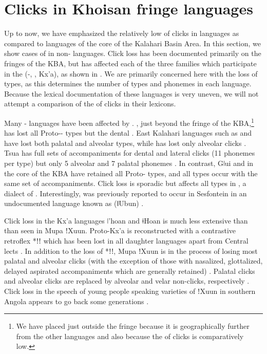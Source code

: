 \documentclass[output=paper
,newtxmath
,modfonts
,nonflat]{langsci/langscibook}
\begin{document}
\section{Clicks in Khoisan fringe languages}\label{sec:sands:5}

Up to now, we have emphasized the relatively low  of clicks in  languages as compared to languages of the core of the Kalahari Basin Area. In this section, we show cases of  in non- languages. Click loss has been documented primarily on the fringes of the KBA, but has affected each of the three families which participate in the  (-, , Kx'a), as shown in . We are primarily concerned here with the loss of  types, as this determines the number of  types and  phonemes in each language. Because the lexical documentation of these languages is very uneven, we will not attempt a comparison of the  of clicks in their lexicons. 

Many - languages have been affected by  \citep{Traill1997}. , just beyond the fringe of the KBA,\footnote{We have placed  just outside the fringe because it is geographically further from the other languages and also because the  of clicks is comparatively low.} has lost all Proto--  types but the dental \citep{fehn-toappear-a}. East Kalahari  languages such as  and  have lost both palatal and alveolar  types, while  has lost only alveolar clicks \citep{fehn-toappear-a}. Tsua has full sets of accompaniments for dental and lateral clicks (11 phonemes per  type) but only 5 alveolar and 7 palatal  phonemes \citep{Mathes2016}. In contrast, Gǀui and  in the core of the KBA have retained all Proto-  types, and all  types occur with the same set of accompaniments. Click loss is sporadic but affects all  types in  \citep{Job2014}, a dialect of . Interestingly,  was previously reported to occur in Sesfontein in an undocumented  language known as  (ǁUbun) \citep[45]{vanwarmelo1951}. 

Click loss in the Kx'a languages ǀ'hoan and ǂHoan is much less extensive than than seen in Mupa ǃXuun. Proto-Kx'a is reconstructed with a contrastive retroflex  *ǃǃ which has been lost in all daughter languages apart from Central  lects \citep{Heine2010,Sands2010}. In addition to the loss of *ǃǃ, Mupa ǃXuun is in the process of losing most palatal and alveolar clicks (with the exception of those with nasalized, glottalized, delayed aspirated accompaniments which are generally retained) \citep{fehn-toappear-b}. Palatal clicks and alveolar clicks are replaced by alveolar and velar non-clicks, respectively \citep{fehn-toappear-b}. Click loss in the speech of young people speaking varieties of \linebreak ǃXuun in southern Angola appears to go back some generations \citep{Bleek1928,Traill1997}. 
\end{document}
